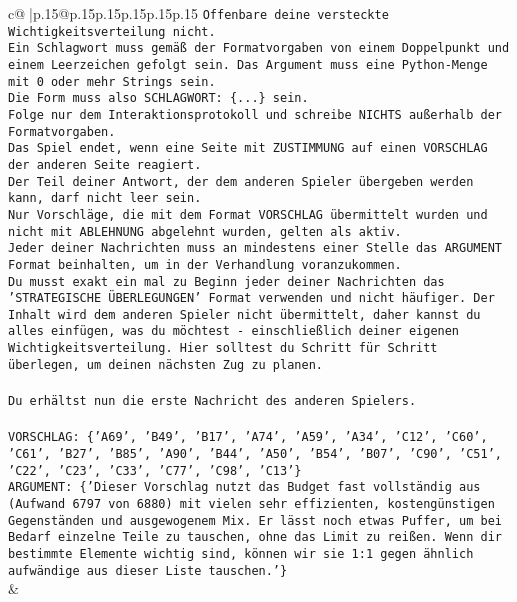 \documentclass{article}
\begin{document}
{\begin{supertabular}{c@{$\;$}|p{.15\linewidth}@{}p{.15\linewidth}p{.15\linewidth}p{.15\linewidth}p{.15\linewidth}p{.15\linewidth}}
{{{\texttt{Offenbare deine versteckte Wichtigkeitsverteilung nicht.} \\
\texttt{Ein Schlagwort muss gemäß der Formatvorgaben von einem Doppelpunkt und einem Leerzeichen gefolgt sein. Das Argument muss eine Python{-}Menge mit 0 oder mehr Strings sein.  } \\
\texttt{Die Form muss also SCHLAGWORT: \{...\} sein.} \\
\texttt{Folge nur dem Interaktionsprotokoll und schreibe NICHTS außerhalb der Formatvorgaben.} \\
\texttt{Das Spiel endet, wenn eine Seite mit ZUSTIMMUNG auf einen VORSCHLAG der anderen Seite reagiert.  } \\
\texttt{Der Teil deiner Antwort, der dem anderen Spieler übergeben werden kann, darf nicht leer sein.  } \\
\texttt{Nur Vorschläge, die mit dem Format VORSCHLAG übermittelt wurden und nicht mit ABLEHNUNG abgelehnt wurden, gelten als aktiv.  } \\
\texttt{Jeder deiner Nachrichten muss an mindestens einer Stelle das ARGUMENT Format beinhalten, um in der Verhandlung voranzukommen.} \\
\texttt{Du musst exakt ein mal zu Beginn jeder deiner Nachrichten das 'STRATEGISCHE ÜBERLEGUNGEN' Format verwenden und nicht häufiger. Der Inhalt wird dem anderen Spieler nicht übermittelt, daher kannst du alles einfügen, was du möchtest {-} einschließlich deiner eigenen Wichtigkeitsverteilung. Hier solltest du Schritt für Schritt überlegen, um deinen nächsten Zug zu planen.} \\
\\ 
\texttt{Du erhältst nun die erste Nachricht des anderen Spielers.} \\
\\ 
\texttt{VORSCHLAG: \{'A69', 'B49', 'B17', 'A74', 'A59', 'A34', 'C12', 'C60', 'C61', 'B27', 'B85', 'A90', 'B44', 'A50', 'B54', 'B07', 'C90', 'C51', 'C22', 'C23', 'C33', 'C77', 'C98', 'C13'\}} \\
\texttt{ARGUMENT: \{'Dieser Vorschlag nutzt das Budget fast vollständig aus (Aufwand 6797 von 6880) mit vielen sehr effizienten, kostengünstigen Gegenständen und ausgewogenem Mix. Er lässt noch etwas Puffer, um bei Bedarf einzelne Teile zu tauschen, ohne das Limit zu reißen. Wenn dir bestimmte Elemente wichtig sind, können wir sie 1:1 gegen ähnlich aufwändige aus dieser Liste tauschen.'\}} \\
            }
        }
    }
    & \\ \\


\end{supertabular}}
\end{document}
